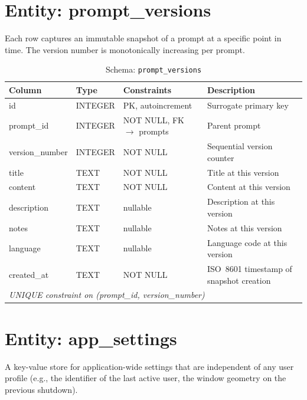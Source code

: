 \documentclass[a4paper, 11pt, oneside]{report}
\begin{document}
\section{Entity: prompt\_versions}
\label{sec:entity-versions}

Each row captures an immutable snapshot of a prompt at a specific point
in time.  The version number is monotonically increasing per prompt.

\begin{table}[H]
  \centering
  \caption{Schema: \texttt{prompt\_versions}}
  \label{tab:schema-versions}
  \begin{tabularx}{\textwidth}{l l l X}
    \toprule
    \textbf{Column} & \textbf{Type} & \textbf{Constraints} & \textbf{Description} \\
    \midrule
    id             & INTEGER & PK, autoincrement         & Surrogate primary key \\
    prompt\_id     & INTEGER & NOT NULL, FK $\to$ prompts & Parent prompt \\
    version\_number& INTEGER & NOT NULL                   & Sequential version counter \\
    title          & TEXT    & NOT NULL                   & Title at this version \\
    content        & TEXT    & NOT NULL                   & Content at this version \\
    description    & TEXT    & nullable                   & Description at this version \\
    notes          & TEXT    & nullable                   & Notes at this version \\
    language       & TEXT    & nullable                   & Language code at this version \\
    created\_at    & TEXT    & NOT NULL                   & ISO~8601 timestamp of snapshot creation \\
    \multicolumn{4}{l}{\textit{UNIQUE constraint on (prompt\_id, version\_number)}} \\
    \bottomrule
  \end{tabularx}
\end{table}

\section{Entity: app\_settings}
\label{sec:entity-settings}

A key-value store for application-wide settings that are independent of any
user profile (e.g., the identifier of the last active user, the window
geometry on the previous shutdown).
\end{document}
